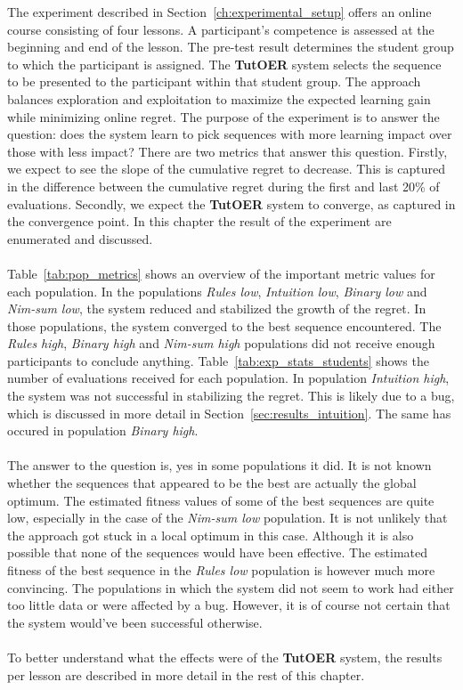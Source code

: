 The experiment described in Section~\ref{ch:experimental_setup} offers an
online course consisting of four lessons. A participant's competence is
assessed at the beginning and end of the lesson. The pre-test result determines
the student group to which the participant is assigned. The \textbf{TutOER}
system selects the sequence to be presented to the participant within that
student group. The approach balances exploration and exploitation to maximize
the expected learning gain while minimizing online regret. The purpose of the
experiment is to answer the question: does the system learn to pick sequences
with more learning impact over those with less impact? There are two metrics
that answer this question. Firstly, we expect to see the slope of the
cumulative regret to decrease. This is captured in the difference between the
cumulative regret during the first and last 20\% of evaluations. Secondly, we
expect the \textbf{TutOER} system to converge, as captured in the convergence
point. In this chapter the result of the experiment are enumerated and discussed.
\\\\
\noindent
Table~\ref{tab:pop_metrics} shows an overview of the important metric values
for each population. In the populations \emph{Rules low}, \emph{Intuition low},
\emph{Binary low} and \emph{Nim-sum low}, the system reduced and stabilized the
growth of the regret. In those populations, the system converged to the best
sequence encountered. The \emph{Rules high}, \emph{Binary high} and
\emph{Nim-sum high} populations did not receive enough participants to conclude
anything. Table~\ref{tab:exp_stats_students} shows the number of evaluations
received for each population. In population \emph{Intuition high}, the system
was not successful in stabilizing the regret. This is likely due to a bug,
which is discussed in more detail in Section~\ref{sec:results_intuition}. The
same has occured in population \emph{Binary high}.\\\\
\noindent
The answer to the question is, yes in some populations it did. It is not known
whether the sequences that appeared to be the best are actually the global
optimum. The estimated fitness values of some of the best sequences are quite
low, especially in the case of the \emph{Nim-sum low} population. It is not
unlikely that the approach got stuck in a local optimum in this case. Although
it is also possible that none of the sequences would have been effective. The
estimated fitness of the best sequence in the \emph{Rules low} population is
however much more convincing. The populations in which the system did not seem
to work had either too little data or were affected by a bug. However, it is of
course not certain that the system would've been successful otherwise.\\\\
\noindent
To better understand what the effects were of the \textbf{TutOER} system, the
results per lesson are described in more detail in the rest of this
chapter.


